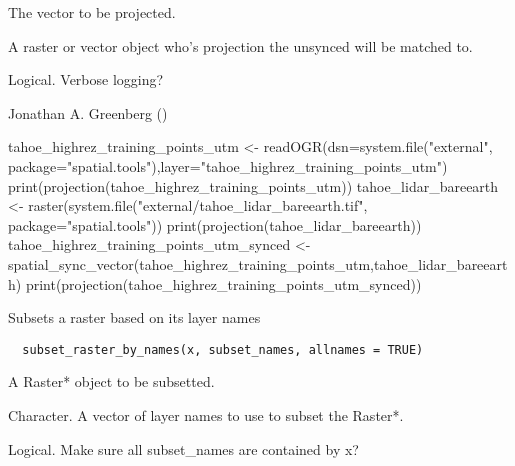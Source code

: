 \documentclass[a4paper]{book}
\begin{document}
%
\begin{Arguments}
\begin{ldescription}
\item[\code{unsynced}] The vector to be projected.

\item[\code{reference}] A raster or vector object who's
projection the unsynced will be matched to.

\item[\code{verbose}] Logical. Verbose logging?
\end{ldescription}
\end{Arguments}
%
\begin{Author}\relax
Jonathan A. Greenberg
()
\end{Author}
%
\begin{Examples}
\begin{ExampleCode}
tahoe_highrez_training_points_utm <- readOGR(dsn=system.file("external", package="spatial.tools"),layer="tahoe_highrez_training_points_utm")
print(projection(tahoe_highrez_training_points_utm))
tahoe_lidar_bareearth <- raster(system.file("external/tahoe_lidar_bareearth.tif", package="spatial.tools"))
print(projection(tahoe_lidar_bareearth))
tahoe_highrez_training_points_utm_synced <- spatial_sync_vector(tahoe_highrez_training_points_utm,tahoe_lidar_bareearth)
print(projection(tahoe_highrez_training_points_utm_synced))
\end{ExampleCode}
\end{Examples}
%
\begin{Description}\relax
Subsets a raster based on its layer names
\end{Description}
%
\begin{Usage}
\begin{verbatim}
  subset_raster_by_names(x, subset_names, allnames = TRUE)
\end{verbatim}
\end{Usage}
%
\begin{Arguments}
\begin{ldescription}
\item[\code{x}] A Raster* object to be subsetted.

\item[\code{subset\_names}] Character. A vector of layer names to
use to subset the Raster*.

\item[\code{allnames}] Logical. Make sure all subset\_names are
contained by x?
\end{ldescription}
\end{Arguments}
\end{document}

